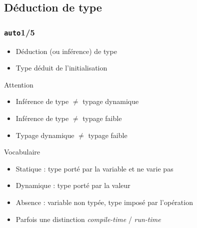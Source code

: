 \documentclass[C++.tex]{subfiles}
\begin{document}
\subsection*{Déduction de type}
\begin{frame}[fragile]
	\frametitle{\lstinline|auto|\titlehfill{}1/5}
	\begin{itemize}
		\item Déduction (ou inférence) de type


		\item Type déduit de l'initialisation
	\end{itemize}

	\pause

	\begin{alertblock}{Attention}
		\begin{itemize}
			\item Inférence de type $\neq$ typage dynamique
			\item Inférence de type $\neq$ typage faible
			\item Typage dynamique $\neq$ typage faible
		\end{itemize}
	\end{alertblock}

	\pause

	\begin{block}{Vocabulaire}
		\begin{itemize}
			\item Statique : type porté par la variable et ne varie pas
			\item Dynamique : type porté par la valeur
			\item Absence : variable non typée, type imposé par l'opération
			\item Parfois une distinction \textit{compile-time} / \textit{run-time}
		\end{itemize}
		
	\end{block}
\end{frame}
\end{document}
